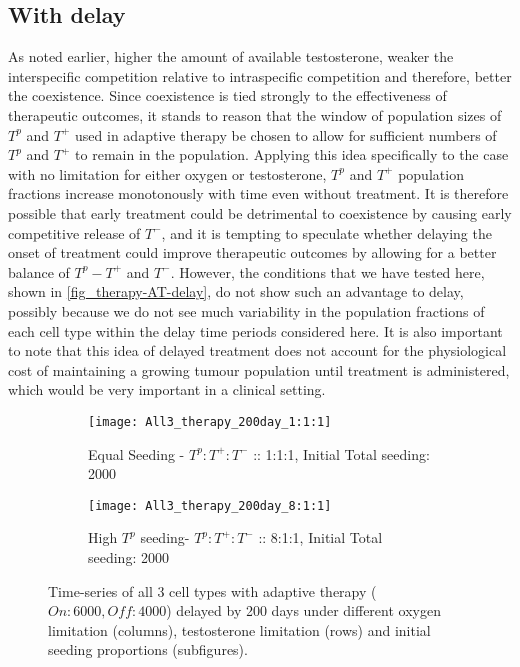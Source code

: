\newpage

\subsection{With delay}
As noted earlier, higher the amount of available testosterone, weaker the interspecific competition relative to intraspecific competition and therefore, better the coexistence. Since coexistence is tied strongly to the effectiveness of therapeutic outcomes, it stands to reason that the window of population sizes of $T^p$ and $T^+$ used in adaptive therapy be chosen to allow for sufficient numbers of $T^p$ and $T^+$ to remain in the population. Applying this idea specifically to the case with no limitation for either oxygen or testosterone, $T^p$ and $T^+$ population fractions increase monotonously with time even without treatment. It is therefore possible that early treatment could be detrimental to coexistence by causing early competitive release of $T^-$, and it is tempting to speculate whether delaying the onset of treatment could improve therapeutic outcomes by allowing for a better balance of $T^p - T^+$ and $T^-$. However, the conditions that we have tested here, shown in \autoref{fig_therapy-AT-delay}, do not show such an advantage to delay, possibly because we do not see much variability in the population fractions of each cell type within the delay time periods considered here. It is also important to note that this idea of delayed treatment does not account for the physiological cost of maintaining a growing tumour population until treatment is administered, which would be very important in a clinical setting.

\begin{figure}
  \centering
  \begin{subfigure}[b]{\textwidth}
    \centering
    \texttt{[image: All3\_therapy\_200day\_1:1:1]}
    \caption{Equal Seeding - $T^p:T^+:T^-$ :: 1:1:1, Initial Total seeding: 2000}
    \label{fig_therapy-AT-delay200_1:1:1-2000}
  \end{subfigure}
  \begin{subfigure}[b]{\textwidth}
    \centering
    \texttt{[image: All3\_therapy\_200day\_8:1:1]}
    \caption{High $T^p$ seeding- $T^p:T^+:T^-$ :: 8:1:1, Initial Total seeding: 2000}
    \label{fig_therapy-AT-delay200_8:1:1-2000}
  \end{subfigure}
  \caption[Time-series of all 3 cell types with delayed adaptive therapy]{Time-series of all 3 cell types with adaptive therapy ($On:6000, Off:4000$) delayed by 200 days under different oxygen limitation (columns), testosterone limitation (rows) and initial seeding proportions (subfigures).}
  \label{fig_therapy-AT-delay}
\end{figure}

